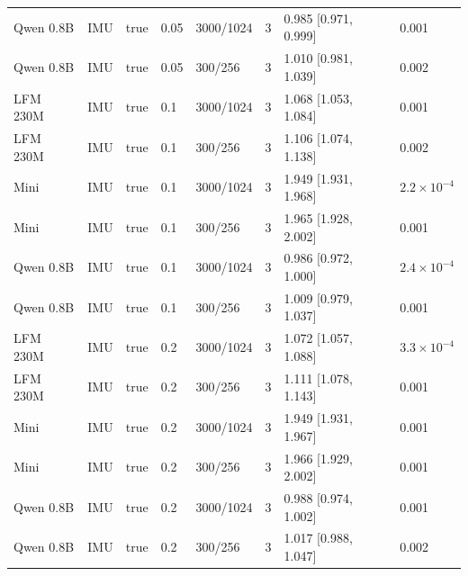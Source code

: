 {\begin{longtable}{@{}llllllll@{}}
Qwen 0.8B & IMU & true & 0.05 & 3000/1024 & 3 & 0.985 [0.971, 0.999] & 0.001 \\
Qwen 0.8B & IMU & true & 0.05 & 300/256 & 3 & 1.010 [0.981, 1.039] & 0.002 \\
LFM 230M & IMU & true & 0.1 & 3000/1024 & 3 & 1.068 [1.053, 1.084] & 0.001 \\
LFM 230M & IMU & true & 0.1 & 300/256 & 3 & 1.106 [1.074, 1.138] & 0.002 \\
Mini & IMU & true & 0.1 & 3000/1024 & 3 & 1.949 [1.931, 1.968] & $2.2\times10^{-4}$ \\
Mini & IMU & true & 0.1 & 300/256 & 3 & 1.965 [1.928, 2.002] & 0.001 \\
Qwen 0.8B & IMU & true & 0.1 & 3000/1024 & 3 & 0.986 [0.972, 1.000] & $2.4\times10^{-4}$ \\
Qwen 0.8B & IMU & true & 0.1 & 300/256 & 3 & 1.009 [0.979, 1.037] & 0.001 \\
LFM 230M & IMU & true & 0.2 & 3000/1024 & 3 & 1.072 [1.057, 1.088] & $3.3\times10^{-4}$ \\
LFM 230M & IMU & true & 0.2 & 300/256 & 3 & 1.111 [1.078, 1.143] & 0.001 \\
Mini & IMU & true & 0.2 & 3000/1024 & 3 & 1.949 [1.931, 1.967] & 0.001 \\
Mini & IMU & true & 0.2 & 300/256 & 3 & 1.966 [1.929, 2.002] & 0.001 \\
Qwen 0.8B & IMU & true & 0.2 & 3000/1024 & 3 & 0.988 [0.974, 1.002] & 0.001 \\
Qwen 0.8B & IMU & true & 0.2 & 300/256 & 3 & 1.017 [0.988, 1.047] & 0.002 \\
\bottomrule
\end{longtable}}\par

